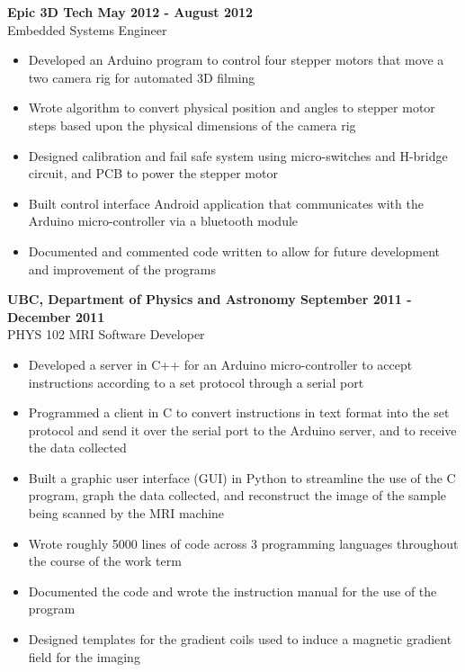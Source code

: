 \documentclass[letterpaper]{article}\usepackage[margin=0.5in]{geometry}
\begin{document}
\vspace{5 mm}
\textbf{Epic 3D Tech \hfill May 2012 - August 2012} \\
Embedded Systems Engineer
\begin{itemize}
\itemsep0em
	\item
	Developed an Arduino program to control four stepper motors that move a two camera rig for automated 3D filming
	\item
	Wrote algorithm to convert physical position and angles to stepper motor steps based upon the physical dimensions of the camera rig
	\item
	Designed calibration and fail safe system using micro-switches and H-bridge circuit, and PCB to power the stepper motor
	\item
	Built control interface Android application that communicates with the Arduino micro-controller via a bluetooth module
	\item
	Documented and commented code written to allow for future development and improvement of the programs
\end{itemize}

\vspace{5 mm}
\textbf{UBC, Department of Physics and Astronomy \hfill September 2011 - December 2011} \\
PHYS 102 MRI Software Developer
\begin{itemize}
\itemsep0em
	\item
	Developed a server in C++ for an Arduino micro-controller to accept instructions according to a set protocol through a serial port
	\item
	Programmed a client in C to convert instructions in text format into the set protocol and send it over the serial port to the Arduino server, and to receive the data collected
	\item
	Built a graphic user interface (GUI) in Python to streamline the use of the C program, graph the data collected, and reconstruct the image of the sample being scanned by the MRI machine
	\item
	Wrote roughly 5000 lines of code across 3 programming languages throughout the course of the work term 
	\item
	Documented the code and wrote the instruction manual for the use of the program
	\item
	Designed templates for the gradient coils used to induce a magnetic gradient field for the imaging
\end{itemize}
	
\end{document}
